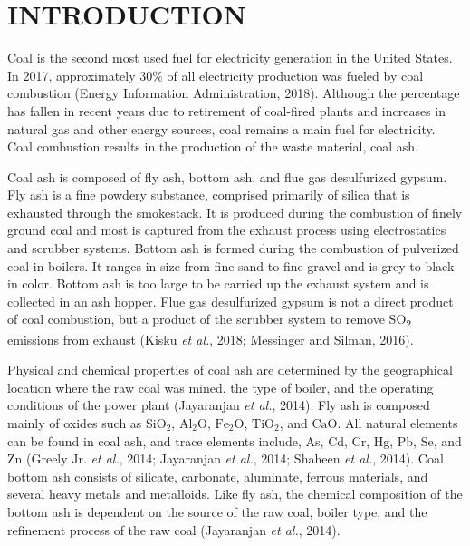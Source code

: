 \documentclass[ms, hidelinks]{uncgdissertationexp}
\theoremstyle{plain}
\theoremstyle{definition}
\theoremstyle{remark}
\begin{document}

\listoffigures


\mainmatter %
\setlength{\parindent}{0.5in}

\hypertarget{intro}{%
\chapter{INTRODUCTION}\label{intro}}

Coal is the second most used fuel for electricity generation in the United States. In 2017, approximately 30\% of all electricity production was fueled by coal combustion (Energy Information Administration, 2018). Although the percentage has fallen in recent years due to retirement of coal-fired plants and increases in natural gas and other energy sources, coal remains a main fuel for electricity. Coal combustion results in the production of the waste material, coal ash.

Coal ash is composed of fly ash, bottom ash, and flue gas desulfurized gypsum. Fly ash is a fine powdery substance, comprised primarily of silica that is exhausted through the smokestack. It is produced during the combustion of finely ground coal and most is captured from the exhaust process using electrostatics and scrubber systems. Bottom ash is formed during the combustion of pulverized coal in boilers. It ranges in size from fine sand to fine gravel and is grey to black in color. Bottom ash is too large to be carried up the exhaust system and is collected in an ash hopper. Flue gas desulfurized gypsum is not a direct product of coal combustion, but a product of the scrubber system to remove SO\textsubscript{2} emissions from exhaust (Kisku \emph{et al.}, 2018; Messinger and Silman, 2016).

Physical and chemical properties of coal ash are determined by the geographical location where the raw coal was mined, the type of boiler, and the operating conditions of the power plant (Jayaranjan \emph{et al.}, 2014). Fly ash is composed mainly of oxides such as \(\mathrm{SiO_2}\), \(\mathrm{Al_2O}\), \(\mathrm{Fe_2O}\), \(\mathrm{TiO_2}\), and \(\mathrm{CaO}\). All natural elements can be found in coal ash, and trace elements include, As, Cd, Cr, Hg, Pb, Se, and Zn (Greely Jr. \emph{et al.}, 2014; Jayaranjan \emph{et al.}, 2014; Shaheen \emph{et al.}, 2014). Coal bottom ash consists of silicate, carbonate, aluminate, ferrous materials, and several heavy metals and metalloids. Like fly ash, the chemical composition of the bottom ash is dependent on the source of the raw coal, boiler type, and the refinement process of the raw coal (Jayaranjan \emph{et al.}, 2014).
\end{document}
